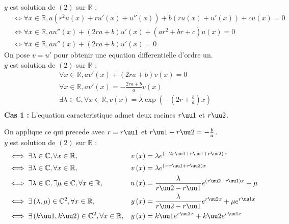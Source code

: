 \documentclass[12pt,twoside,a4paper]{article}
\begin{document}
\begin{preuve}
\begin{liste}
$$\begin{aligned}
						\end{aligned}$$
						$y$ est solution de $\left(2\right)$ sur $\mathbb{R}$ :
						$$\begin{aligned}
							&\iff\forall x\in\mathbb{R},a\left(r^2u\left(x\right)+ru'\left(x\right)+u''\left(x\right)\right)+b\left(ru\left(x\right)+u'\left(x\right)\right)+cu\left(x\right)=0 \\
							&\iff\forall x\in\mathbb{R},au''\left(x\right)+\left(2ra+b\right)u'\left(x\right)+\left(ar^2+br+c\right)u\left(x\right)=0 \\
							&\iff\forall x\in\mathbb{R},au''\left(x\right)+\left(2ra+b\right)u'\left(x\right)=0
						\end{aligned}$$
						On pose $v=u'$ pour obtenir une equation differentielle d'ordre un. \\
						$y$ est solution de $\left(2\right)$ sur $\mathbb{R}$ :
						$$\begin{aligned}
							&\forall x\in\mathbb{R},av'\left(x\right)+\left(2ra+b\right)v\left(x\right)=0 \\
							&\forall x\in\mathbb{R},av'\left(x\right)=-\frac{2ra+b}{a}v\left(x\right) \\
							&\exists\lambda\in\mathbb{C},\forall x\in\mathbb{R},v\left(x\right)=\lambda\exp\left(-\left(2r+\frac{b}{a}\right)x\right) \\
						\end{aligned}$$
						\textbf{Cas 1 :} L'equation caracteristique admet deux racines $r\uu1$ et $r\uu2$.
						\begin{tab}
							On applique ce qui precede avec $r=r\uu1$ et $r\uu1+r\uu2=-\frac{b}{a}$. \\
							$y$ est solution de $\left(2\right)$ sur $\mathbb{R}$ :
							$$\begin{aligned}
								&\iff\exists\lambda\in\mathbb{C},\forall x\in\mathbb{R},&v\left(x\right)&=\lambda e^{\left(-2r\uu1+r\uu1+r\uu2\right)x} \\
								&\iff\exists\lambda\in\mathbb{C},\forall x\in\mathbb{R},&v\left(x\right)&=\lambda e^{\left(-r\uu1+r\uu2\right)x} \\
								&\iff\exists\lambda\in\mathbb{C},\exists\mu\in\mathbb{C},\forall x\in\mathbb{R},&u\left(x\right)&=\frac{\lambda}{r\uu2-r\uu1}e^{\left(r\uu2-r\uu1\right)x}+\mu \\
								&\iff\exists\left(\lambda,\mu\right)\in\mathbb{C}^2,\forall x\in\mathbb{R},&y\left(x\right)&=\frac{\lambda}{r\uu2-r\uu1}e^{r\uu2x}+\mu e^{r\uu1x} \\
								&\iff\exists\left(k\uu1,k\uu2\right)\in\mathbb{C}^2,\forall x\in\mathbb{R},&y\left(x\right)&=k\uu1e^{r\uu2x}+k\uu2 e^{r\uu1x}

\end{aligned}$$
\end{tab}
\end{liste}
\end{preuve}
\end{document}
